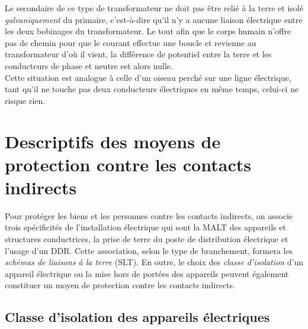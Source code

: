 Le secondaire de ce type de transformateur ne doit pas être relié à la terre et isolé \emph{galvaniquement} du primaire, c'est-à-dire qu'il n'y a aucune liaison électrique entre les deux bobinages du transformateur. Le tout afin que le corps humain n'offre pas de chemin pour que le courant effectue une boucle et revienne au transformateur d'où il vient, la différence de potentiel entre la terre et les conducteurs de phase et neutre est alors nulle.\\Cette situation est analogue à celle d'un oiseau perché sur une ligne électrique, tant qu'il ne touche pas deux conducteurs électriques en même temps, celui-ci ne risque rien.

\section{Descriptifs des moyens de protection contre les contacts indirects\label{sec:moyens_protection_contacts_indirects}}

Pour protéger les biens et les personnes contre les contacts indirects, on associe trois spécificités de l'installation électrique qui sont la MALT des appareils et structures conductrices, la prise de terre du poste de distribution électrique et l'usage d'un DDR. Cette association, selon le type de branchement, formera les \emph{schémas de liaisons à la terre} (SLT). En outre, le choix des \emph{classe d'isolation} d'un appareil électrique ou la mise hors de portées des appareils peuvent également constituer un moyen de protection contre les contacts indirects.

\subsection{Classe d'isolation des appareils électriques}

